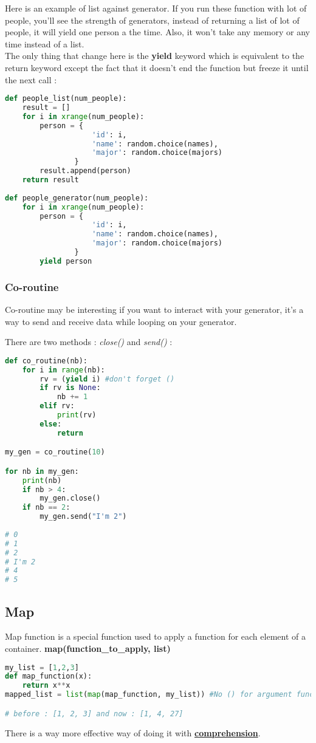\documentclass[a4paper, 12pt, titlepage]{scrartcl} %
\begin{document}
Here is an example of list against generator. If you run these function with lot of people, you'll see the strength of generators, instead of returning a list of lot of people, it will yield one person a the time. Also, it won't take any memory or any time instead of a list. \\
The only thing that change here is the \textbf{yield} keyword which is equivalent to the return keyword except the fact that it doesn't end the function but freeze it until the next call :
\begin{lstlisting}[language=Python]
def people_list(num_people):
    result = []
    for i in xrange(num_people):
        person = {
                    'id': i,
                    'name': random.choice(names),
                    'major': random.choice(majors)
                }
        result.append(person)
    return result
    
def people_generator(num_people):
    for i in xrange(num_people):
        person = {
                    'id': i,
                    'name': random.choice(names),
                    'major': random.choice(majors)
                }
        yield person
\end{lstlisting} \vspace{5mm}

\subsubsection{Co-routine}
Co-routine may be interesting if you want to interact with your generator, it's a way to send and receive data while looping on your generator. 

There are two methods : \textit{close()} and \textit{send()} :

\begin{lstlisting}[language=Python]
def co_routine(nb):
	for i in range(nb):
		rv = (yield i) #don't forget ()
		if rv is None:
			nb += 1
		elif rv:
			print(rv)
		else:
			return

my_gen = co_routine(10)

for nb in my_gen:
	print(nb)
	if nb > 4:
		my_gen.close()
	if nb == 2:
		my_gen.send("I'm 2")
		
# 0
# 1
# 2
# I'm 2
# 4
# 5
\end{lstlisting} \vspace{5mm}


\subsection{Map}
Map function is a special function used to apply a function for each element of a container. \textbf{map(function\_to\_apply, list)}
\begin{lstlisting}[language=Python]
my_list = [1,2,3]
def map_function(x):
	return x**x
mapped_list = list(map(map_function, my_list)) #No () for argument function

# before : [1, 2, 3] and now : [1, 4, 27]
\end{lstlisting} \vspace{5mm}
There is a way more effective way of doing it with \hyperref[Comprehension]{\textbf{comprehension}}.
\end{document}
